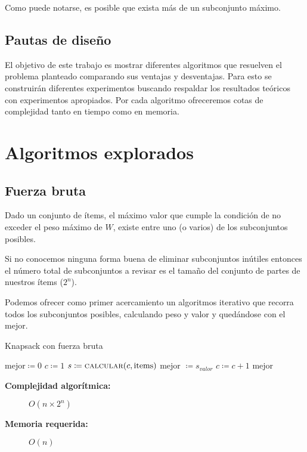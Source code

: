 \documentclass[fleqn, 11pt]{article}
\def\is{\coloneqq}
\begin{document}
Como puede notarse, es posible que exista más de un subconjunto máximo.

\subsection{Pautas de diseño}

El objetivo de este trabajo es mostrar diferentes algoritmos que resuelven el
problema planteado comparando sus ventajas y desventajas. Para esto se
construirán diferentes experimentos buscando respaldar los resultados teóricos
con experimentos apropiados. Por cada algoritmo ofreceremos cotas de
complejidad tanto en tiempo como en memoria.

\section{Algoritmos explorados}

\subsection{Fuerza bruta}

Dado un conjunto de ítems, el máximo valor que cumple la condición de no
exceder el peso máximo de $W$, existe entre uno (o varios) de los subconjuntos
posibles.

Si no conocemos ninguna forma buena de eliminar subconjuntos inútiles entonces
el número total de subconjuntos a revisar es el tamaño del conjunto de partes
de nuestros ítems ($2^n$).

Podemos ofrecer como primer acercamiento un algoritmos iterativo que recorra
todos los subconjuntos posibles, calculando peso y valor y quedándose con el
mejor.

\begin{algorithm}
\caption{Knapsack con fuerza bruta}
\begin{algorithmic}[1]
\Statex
{}
\State $\text{mejor} \is 0$
\State $c \is 1$
	\State $s \is \Call{calcular}{c, \text{items}}$
		\State mejor $\is s_{valor}$
	\EndIf
	\State $c \is c + 1$
\EndWhile
\State \Return mejor
\EndFunction
\end{algorithmic}
\begin{description}
	\item[\textbf{Complejidad algorítmica:}] $O(n \times 2^n)$
	\item[\textbf{Memoria requerida:}] $O(n)$
\end{description}
\end{algorithm}
\end{document}
